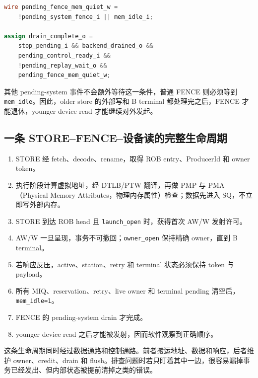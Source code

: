 \documentclass[UTF8,a4paper,zihao=-4,oneside]{ctexart}
\begin{document}
\noindent\begin{minipage}{\linewidth}
\begin{lstlisting}[language=Verilog,firstnumber=92,
  caption={普通 FENCE 只有在 \texttt{mem\_idle} 时才能完成 drain},
  label={code:fence-drain}]
wire pending_fence_mem_quiet_w =
    !pending_system_fence_i || mem_idle_i;

assign drain_complete_o =
    stop_pending_i && backend_drained_o &&
    pending_control_ready_i &&
    !pending_replay_wait_o &&
    pending_fence_mem_quiet_w;
\end{lstlisting}
\end{minipage}

其他 pending-system 事件不会额外等待这一条件，普通 FENCE 则必须等到 \texttt{mem\_idle}。因此，older store 的外部写和 B terminal 都处理完之后，FENCE 才能退休，younger device read 才能继续对外发起。

\subsection{一条 STORE--FENCE--设备读的完整生命周期}

\begin{enumerate}
  \item STORE 经 fetch、decode、rename，取得 ROB entry、ProducerId 和 owner token。
  \item 执行阶段计算虚拟地址，经 DTLB/PTW 翻译，再做 PMP 与 PMA（Physical Memory Attributes，物理内存属性）检查；数据先进入 SQ，不立即写外部内存。
  \item STORE 到达 ROB head 且 \texttt{launch\_open} 时，获得首次 AW/W 发射许可。
  \item AW/W 一旦呈现，事务不可撤回；\texttt{owner\_open} 保持精确 owner，直到 B terminal。
  \item 若响应反压，active、station、retry 和 terminal 状态必须保持 token 与 payload。
  \item 所有 MIQ、reservation、retry、live owner 和 terminal pending 清空后，\texttt{mem\_idle=1}。
  \item FENCE 的 pending-system drain 才完成。
  \item younger device read 之后才能被发射，因而软件观察到正确顺序。
\end{enumerate}

这条生命周期同时经过数据通路和控制通路。前者搬运地址、数据和响应，后者维护 owner、credit、drain 和 flush。排查问题时若只盯着其中一边，很容易漏掉事务已经发出、但内部状态被提前清掉之类的错误。
\end{document}
